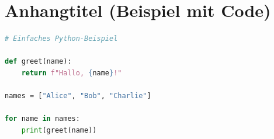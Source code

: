 \documentclass[12pt,a4paper,numbers=noenddot]{scrreprt}
\begin{document}
\maketitle



\tableofcontents       %
\cleardoublepage


\cleardoublepage

\listoffigures         %
\cleardoublepage

\listoftables          %
\cleardoublepage

\setcounter{page}{1}




\appendix
\chapter{Anhangtitel (Beispiel mit Code)}
\label{anh:beispiel}

\begin{lstlisting}[language=Python]
# Einfaches Python-Beispiel

def greet(name):
    return f"Hallo, {name}!"

names = ["Alice", "Bob", "Charlie"]

for name in names:
    print(greet(name))
\end{lstlisting}

\printbibliography[heading=bibintoc]

% 

% 
\end{document}
